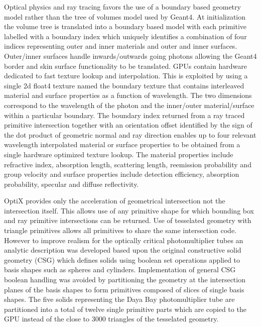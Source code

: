 \documentclass[a4paper]{jpconf}
\begin{document}
Optical physics and ray tracing favors the use of a boundary based geometry model 
rather than the tree of volumes model used by Geant4. 
At initialization the volume tree is translated into a boundary based model 
with each primitive labelled with a boundary index which uniquely identifies 
a combination of four indices representing outer and inner materials and outer and inner surfaces.
Outer/inner surfaces handle inwards/outwards going photons allowing the Geant4 border and skin 
surface functionality to be translated.
GPUs contain hardware dedicated to fast texture lookup and interpolation. 
This is exploited by using a single 2d float4 texture named the boundary texture 
that contains interleaved material and surface properties as a function of wavelength. 
The two dimensions correspond to the wavelength of the photon and the inner/outer material/surface 
within a particular boundary. 
The boundary index returned from a ray traced primitive intersection together with 
an orientation offset identified by the sign of the dot product of geometric normal and ray direction 
enables up to four relevant wavelength interpolated material or surface properties to be 
obtained from a single hardware optimized texture lookup.
The material properties include refractive index, absorption length, scattering length, reemission probability and  group velocity
and surface properties include detection efficiency, absorption probability, specular and diffuse reflectivity.

OptiX provides only the acceleration of geometrical intersection not the intersection itself. 
This allows use of any primitive shape for which bounding box and ray primitive intersections can be returned.
Use of tesselated geometry with triangle primitives allows all primitives to share the same intersection code. 
However to improve realism for the optically critical photomultiplier tubes 
an analytic description was developed based upon the original constructive solid geometry (CSG)
which defines solids using boolean set operations applied to basis shapes such as spheres and cylinders.
Implementation of general CSG boolean handling was avoided by partitioning the geometry at 
the intersection planes of the basis shapes to form primitives 
composed of slices of single basis shapes. The five solids representing the Daya Bay 
photomultiplier tube are partitioned into a total of twelve single primitive parts 
which are copied to the GPU instead of the close to 3000 triangles of the tesselated geometry. 
\end{document}
